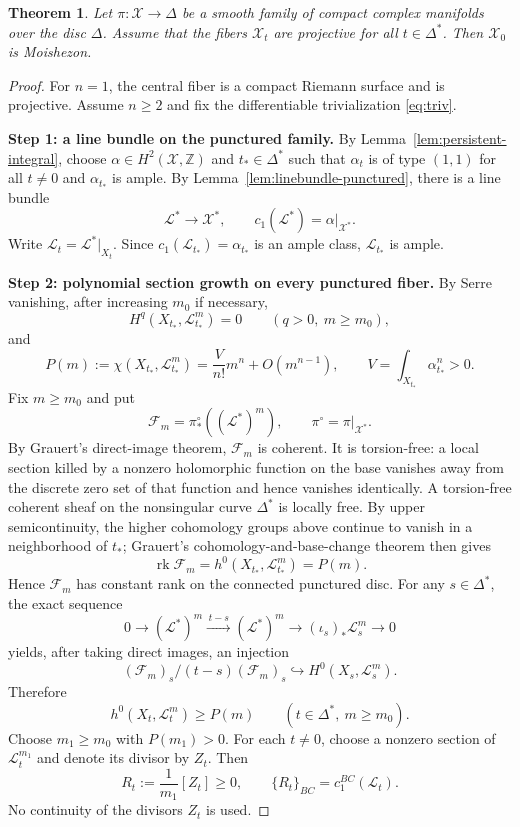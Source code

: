 \documentclass[11pt,letterpaper]{amsart}
\numberwithin{equation}{section}
\newcommand{\ZZ}{\mathbb{Z}}
\newcommand{\cal}{\mathcal}
\def\cF{{\cal F}}
\def\cL{{\cal L}}
\def\cX{{\cal X}}
\newtheorem{theo}[prop]{Theorem}
\begin{document}
\begin{theo}\label{limit-proj}
Let $\pi:\cX\to\Delta$ be a smooth family of compact complex manifolds over
the disc $\Delta$. Assume that the fibers $\cX_t$ are projective
for all $t\in\Delta^*$. Then $\cX_0$ is Moishezon.
\end{theo}
\begin{proof}
For $n=1$, the central fiber is a compact Riemann surface and is projective.
Assume $n\ge2$ and fix the differentiable trivialization \eqref{eq:triv}.

\smallskip
\noindent\textbf{Step 1: a line bundle on the punctured family.}
By Lemma~\ref{lem:persistent-integral}, choose
$\alpha\in H^2(\cX,\ZZ)$ and $t_*\in\Delta^*$ such that $\alpha_t$ is of type
$(1,1)$ for all $t\ne0$ and $\alpha_{t_*}$ is ample. By
Lemma~\ref{lem:linebundle-punctured}, there is a line bundle
\begin{equation}\label{eq:Lstar}
 \cL^*\longrightarrow\cX^*,\qquad
 c_1(\cL^*)=\alpha|_{\cX^*}.
\end{equation}
Write $\cL_t=\cL^*|_{X_t}$. Since
$c_1(\cL_{t_*})=\alpha_{t_*}$ is an ample class, $\cL_{t_*}$ is ample.

\smallskip
\noindent\textbf{Step 2: polynomial section growth on every punctured fiber.}
By Serre vanishing, after increasing $m_0$ if necessary,
\[
 H^q(X_{t_*},\cL_{t_*}^m)=0\qquad(q>0,\ m\ge m_0),
\]
and
\begin{equation}\label{eq:P}
 P(m):=\chi(X_{t_*},\cL_{t_*}^m)
 =\frac{V}{n!}m^n+O(m^{n-1}),\qquad
 V=\int_{X_{t_*}}\alpha_{t_*}^n>0.
\end{equation}
Fix $m\ge m_0$ and put
\[
 \cF_m=\pi^\circ_*((\cL^*)^m),\qquad
 \pi^\circ=\pi|_{\cX^*}.
\]
By Grauert's direct-image theorem, $\cF_m$ is coherent. It is torsion-free: a local
section killed by a nonzero holomorphic function on the base vanishes away
from the discrete zero set of that function and hence vanishes identically.
A torsion-free coherent sheaf on the nonsingular curve $\Delta^*$ is locally
free. By upper semicontinuity, the higher cohomology groups above continue to
vanish in a neighborhood of $t_*$; Grauert's cohomology-and-base-change theorem
then gives
\[
 \operatorname{rk}\cF_m=h^0(X_{t_*},\cL_{t_*}^m)=P(m).
\]
Hence $\cF_m$ has constant rank on the connected punctured disc. For any
$s\in\Delta^*$, the exact sequence
\[
 0\to(\cL^*)^m\xrightarrow{\,t-s\,}(\cL^*)^m
 \to(\iota_s)_*\cL_s^m\to0
\]
yields, after taking direct images, an injection
\[
 (\cF_m)_s/(t-s)(\cF_m)_s\hookrightarrow H^0(X_s,\cL_s^m).
\]
Therefore
\begin{equation}\label{eq:h0lower}
 h^0(X_t,\cL_t^m)\ge P(m)
 \qquad(t\in\Delta^*,\ m\ge m_0).
\end{equation}
Choose $m_1\ge m_0$ with $P(m_1)>0$. For each $t\ne0$, choose a nonzero section of $\cL_t^{m_1}$ and denote its divisor by $Z_t$. Then
\begin{equation}\label{eq:R_t}
 R_t:=\frac1{m_1}[Z_t]\ge0,\qquad
 \{R_t\}_{BC}=c_1^{BC}(\cL_t).
\end{equation}
No continuity of the divisors $Z_t$ is used.


\end{proof}
\end{document}
